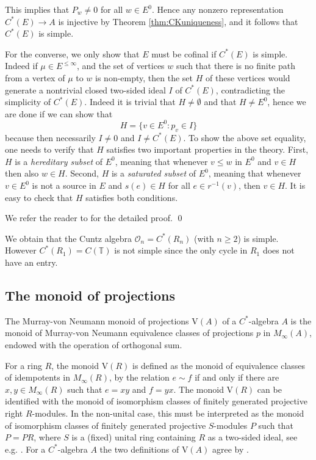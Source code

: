 \documentclass[11pt]{amsart}
\theoremstyle{plain}            %
\theoremstyle{definition}       %
\theoremstyle{definition}       %
\theoremstyle{remark}
\newcommand{\V}{\mathrm{V}}
\begin{document}
This implies that $P_w\ne 0$ for all $w\in E^0$. Hence any nonzero representation $C^*(E)\to A$ is injective by Theorem \ref{thm:CKuniqueness}, and it follows that $C^*(E)$ is simple.

For the converse, we only show that $E$ must be cofinal if $C^*(E)$ is simple.  Indeed if $\mu \in E^{\le \infty}$, and the set of vertices $w$ such that there is no finite path from a vertex of $\mu$ to $w$ is non-empty, then the set $H$ of these vertices would generate a nontrivial closed two-sided ideal $I$ of $C^*(E)$, contradicting the simplicity of $C^*(E)$. Indeed it is trivial that 
$H\ne \emptyset$ and that $H\ne E^0$, hence we are done if we can show that 
$$H= \{v\in E^0 : p_v\in I\}$$
because then necessarily $I\ne 0$ and $I\ne C^*(E)$. 
 To show the above set equality, one needs to verify that $H$ satisfies two important properties in the theory. First, $H$ is a {\it hereditary subset} of $E^0$, meaning that whenever $v\le w$ in $E^0$ and $v\in H$ then also $w\in H$. Second, $H$ is a {\it saturated subset} of $E^0$, meaning that whenever $v\in E^0$ is not a source in $E$ and $s(e)\in H$ for all $e\in r^{-1}(v)$, then $v\in H$. It is easy to check that $H$ satisfies both conditions.  
      

We refer the reader to \cite[Theorem 4.14]{rae} for the detailed proof. 
\qed

\medskip


We obtain that the Cuntz algebra $\mathcal O _n= C^*(R_n)$ (with $n\ge 2$) is simple. However $C^*(R_1) = C(\mathbb T)$ is not simple since the only cycle in $R_1$ does not have an entry.  

\subsection{The monoid of projections}

The  Murray-von Neumann monoid of projections $\V(A)$ of a $C^*$-algebra $A$ is the monoid of Murray-von Neumann equivalence classes of projections $p$ in $M_\infty (A)$, endowed with the operation of orthogonal sum. 

For a ring $R$, the monoid $\V (R)$ is defined as the monoid of equivalence classes of idempotents in $M_{\infty}(R)$, by the relation $e\sim f$ if and only if there are $x,y\in M_{\infty}(R)$ such that $e= xy$ and $f=yx$. The monoid $\V(R)$ can be identified with the monoid of isomorphism classes of finitely generated projective right $R$-modules. In the non-unital case, this must be interpreted as the monoid of isomorphism classes of finitely generated projective $S$-modules $P$ such that $P=PR$, where $S$ is a (fixed) unital ring containing $R$ as a two-sided ideal, see e.g. \cite[Section 5]{Kenlimits}. For a $C^*$-algebra $A$ the two definitions of $\V (A)$ agree by \cite[Section 4.6]{Black}. 
\end{document}
